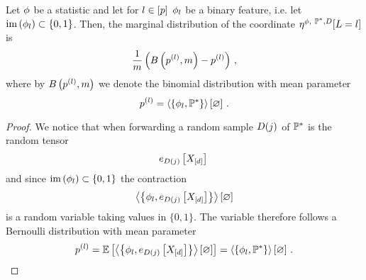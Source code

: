 \begin{lemma}
	Let $\phi$ be a statistic and let for $l\in[p]$ $\phi_l$ be a binary feature, i.e. let $\mathrm{im}\left(\phi_l\right)\subset \{0,1\}$.
	Then, the marginal distribution of the coordinate $\expfamfluctuation[\selvariable=\statenumerator]$ is 
		\[\frac{1}{m}\left(B\left(p^{(l)},m\right)- p^{(l)}\right)  \, , \] 
	where by $B\left(p^{(l)},m\right)$ we denote the binomial distribution with mean parameter
		\[ p^{(l)} = \left\langle \left\{\phi_l, \mathbb{P}^*\right\}\right\rangle \left[ \varnothing \right] \, . \]
\end{lemma}
\begin{proof}
	We notice that when forwarding a random sample $D(j)$ of $\mathbb{P}^*$ is the random tensor
		\[ e_{D(j)}\left[X_{[d]}\right] \, \]
	and since $\mathrm{im}\left(\phi_l\right)\subset \{0,1\}$ the contraction
		\[ \left\langle \left\{\phi_l, e_{D(j)}\left[X_{[d]}\right]\right\}\right\rangle \left[ \varnothing \right] \]
	is a random variable taking values in $\{0,1\}$.
	The variable therefore follows a Bernoulli distribution with mean parameter
		\[ p^{(l)} = \mathbb{E}\left[\left\langle \left\{\phi_l, e_{D(j)}\left[X_{[d]}\right]\right\}\right\rangle \left[ \varnothing \right]\right] = \left\langle \left\{\phi_l, \mathbb{P}^*\right\}\right\rangle \left[ \varnothing \right]  \, . \]
\end{proof}


%


